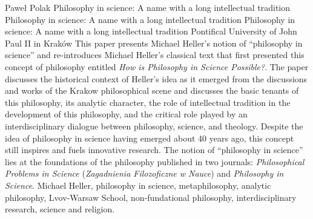\begin{artengenv}{Paweł Polak}
	{Philosophy in science: A name with a long intellectual tradition}
	{Philosophy in science: A name with a long intellectual tradition}
	{Philosophy in science: A name with a long intellectual tradition}
	{Pontifical University of John Paul II in Kraków\label{polak-start}}
	{This paper presents Michael Heller’s notion of ``philosophy in science'' and re-introduces Michael Heller’s classical
		text that first presented this concept of philosophy entitled \textit{How is Philosophy in Science
			Possible?}. The paper discusses the historical context of Heller’s idea as it emerged from the discussions and works of
		the Krakow philosophical scene and discusses the basic tenants of this philosophy, its analytic character, the role of
		intellectual tradition in the development of this philosophy, and the critical role played by an interdisciplinary
		dialogue between philosophy, science, and theology. Despite the idea of philosophy in science having emerged about 40
		years ago, this concept still inspires and fuels innovative research. The notion of ``philosophy in science'' lies at the
		foundations of the philosophy published in two journals: \textit{Philosophical Problems in Science}
		(\textit{Zagadnienia Filozoficzne w Nauce}) and \textit{Philosophy in Science}.}
	{Michael Heller, philosophy in science, metaphilosophy, analytic philosophy, Lvov-Warsaw School, non-fundational philosophy, interdisciplinary research, science and religion.}







\end{artengenv}
